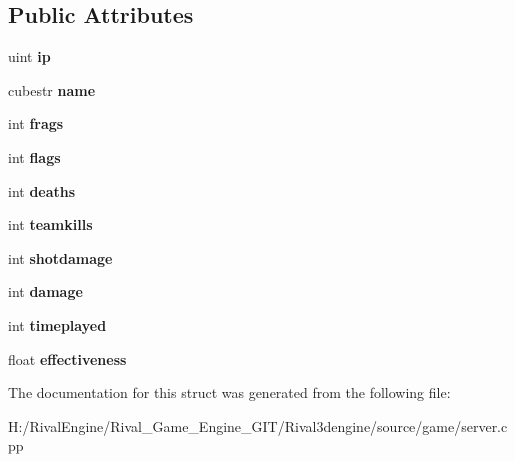 \subsection*{Public Attributes}
\begin{DoxyCompactItemize}
\item 
\mbox{\label{structserver_1_1savedscore_a66cb16e95fa76613b0825985b7257dde}} 
uint {\bfseries ip}
\item 
\mbox{\label{structserver_1_1savedscore_ad3bc8bc74eeb41a59dcc264d151d28ba}} 
cubestr {\bfseries name}
\item 
\mbox{\label{structserver_1_1savedscore_a5e1e54479e45883401520d530d282eaa}} 
int {\bfseries frags}
\item 
\mbox{\label{structserver_1_1savedscore_a5d52366e9483015e154778afc33133ab}} 
int {\bfseries flags}
\item 
\mbox{\label{structserver_1_1savedscore_a05e9719fbf1e7e1c8522741bf8f6ebac}} 
int {\bfseries deaths}
\item 
\mbox{\label{structserver_1_1savedscore_a54d38b1a5de5375cefa005f36fc3118f}} 
int {\bfseries teamkills}
\item 
\mbox{\label{structserver_1_1savedscore_a4de25729e556fb449c9b6108fabbab5c}} 
int {\bfseries shotdamage}
\item 
\mbox{\label{structserver_1_1savedscore_aeffbf1f4d8c8dc95393a387eebec8e05}} 
int {\bfseries damage}
\item 
\mbox{\label{structserver_1_1savedscore_afeafa0bef3592c442bbbfae26f8166e5}} 
int {\bfseries timeplayed}
\item 
\mbox{\label{structserver_1_1savedscore_a44ec11801f3624b635127b6328bab74d}} 
float {\bfseries effectiveness}
\end{DoxyCompactItemize}


The documentation for this struct was generated from the following file\+:\begin{DoxyCompactItemize}
\item 
H\+:/\+Rival\+Engine/\+Rival\+\_\+\+Game\+\_\+\+Engine\+\_\+\+G\+I\+T/\+Rival3dengine/source/game/server.\+cpp\end{DoxyCompactItemize}
